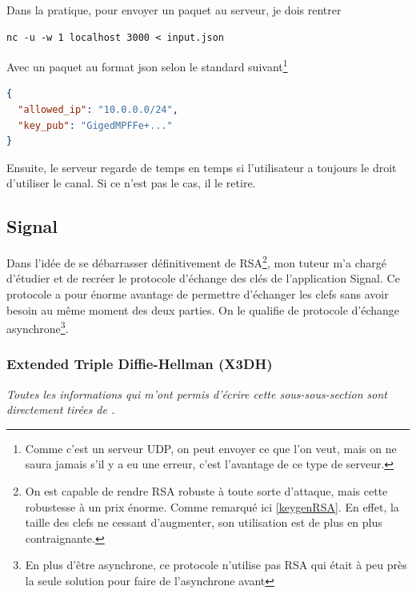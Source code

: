 \documentclass[a4paper, 12pt]{article}
\begin{document}
\noindent Dans la pratique, pour envoyer un paquet au serveur, je dois rentrer 
\begin{center}
\begin{minipage}{.67\linewidth}
\begin{lstlisting}[language = shell]
nc -u -w 1 localhost 3000 < input.json
\end{lstlisting}
\end{minipage}
\end{center}
Avec un paquet au format json selon le standard suivant\footnote{Comme c'est un serveur UDP, on peut envoyer ce que l'on veut, mais on ne saura jamais s'il y a eu une erreur, c'est l'avantage de ce type de serveur.}
\begin{center}
\begin{minipage}{.51\linewidth}
\begin{lstlisting}[language = json]
{
  "allowed_ip": "10.0.0.0/24", 
  "key_pub": "GigedMPFFe+..."
}
\end{lstlisting}
\end{minipage}
\end{center}
Ensuite, le serveur regarde de temps en temps si l'utilisateur a toujours le droit d'utiliser le canal. Si ce n'est pas le cas, il le retire.

\subsection{Signal}
Dans l'idée de se débarrasser définitivement de RSA\footnote{On est capable de rendre RSA robuste à toute sorte d'attaque, mais cette robustesse à un prix énorme. Comme remarqué ici \ref{keygenRSA}. En effet, la taille des clefs ne cessant d'augmenter, son utilisation est de plus en plus contraignante.}, mon tuteur m'a chargé d'étudier et de recréer le protocole d'échange des clés de l'application Signal. Ce protocole a pour énorme avantage de permettre d'échanger les clefs sans avoir besoin au même moment des deux parties. On le qualifie de protocole d'échange asynchrone\footnote{En plus d'être asynchrone, ce protocole n'utilise pas RSA qui était à peu près la seule solution pour faire de l'asynchrone avant}.

\subsubsection{Extended Triple Diffie-Hellman (X3DH)}
\noindent\emph{Toutes les informations qui m'ont permis d'écrire cette sous-sous-section sont directement tirées de \cite{xtroisdh}.}\\
\end{document}
